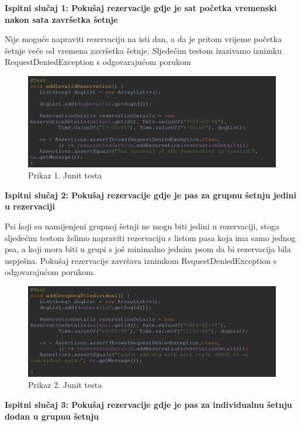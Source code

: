 			\noindent \textbf{Ispitni slučaj 1: Pokušaj rezervacije gdje je sat početka vremenski nakon sata završetka šetnje}
			
			Nije moguće napraviti rezervaciju na isti dan, a da je pritom vrijeme početka šetnje veće od vremena završetka šetnje. Sljedećim testom izazivamo iznimku RequestDeniedException s odgovarajućom porukom
			
			\begin{figure}[H]
				\includegraphics[scale=0.6]{slike/junit-1.PNG}
				\centering
				\caption{Prikaz 1. Junit testa}
				\label{fig:testiranje}
			\end{figure}
			
			\noindent \textbf{Ispitni slučaj 2: Pokušaj rezervacije gdje je pas za grupnu šetnju jedini u rezervaciji}
			
			Psi koji su namijenjeni grupnoj šetnji ne mogu biti jedini u rezervaciji, stoga sljedećim testom želimo napraviti rezervaciju s listom pasa koja ima samo jednog psa, a koji mora biti u grupi s još minimalno jednim psom da bi rezervacija bila uspješna. Pokušaj rezervacije završava iznimkom RequestDeniedException s odgovarajućom porukom.
			
			\begin{figure}[H]
				\includegraphics[scale=0.6]{slike/junit-2.PNG}
				\centering
				\caption{Prikaz 2. Junit testa}
				\label{fig:testiranje}
			\end{figure}
			
			\noindent \textbf{Ispitni slučaj 3: Pokušaj rezervacije gdje je pas za individualnu šetnju dodan u grupnu šetnju}
			
